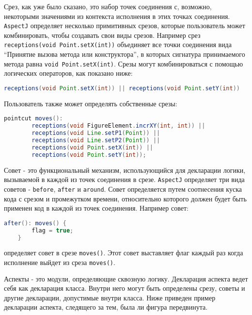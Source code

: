 Срез, как уже было сказано, это набор точек соединения с, возможно, некоторыми значениями из контекста исполнения в этих точках соединения. \texttt{AspectJ} определяет несколько примитивных срезов, которые пользователь может комбинировать, чтобы создавать свои виды срезов. Например срез \texttt{receptions(void Point.setX(int))} объединяет все точки соединения вида ``Принятие вызова метода или конструктора'', в которых сигнатура принимаемого метода равна \texttt{void Point.setX(int)}. Срезы могут комбинироваться с помощью логических операторов, как показано ниже:

\begin{lstlisting}[language=Java, caption={Срез, следящий за координатой точки \texttt{x} или \texttt{y}.}]
    receptions(void Point.setX(int)) || receptions(void Point.setY(int))
\end{lstlisting}

Пользователь также может определять собственные срезы:

\begin{lstlisting}[language=Java, caption={Пользовательский срез, следящий за координатой точки \texttt{x} или \texttt{y}.}]
    pointcut moves():
        receptions(void FigureElement.incrXY(int, int)) ||
        receptions(void Line.setP1(Point)) ||
        receptions(void Line.setP2(Point)) ||
        receptions(void Point.setX(int)) ||
        receptions(void Point.setY(int));
\end{lstlisting}

Совет - это функциональный механизм, использующийся для декларации логики, вызываемой в каждой из точек соединения в срезе. \texttt{AspectJ} определяет три вида советов - \texttt{before}, \texttt{after} и \texttt{around}. Совет определяется путем соотнесения куска кода с срезом и промежутком времени, относительно которого должен будет быть применен код в каждой из точек соединения. Например совет:

\begin{lstlisting}[language=Java, caption={Совет, отмечающий изменения точки \texttt{x} или \texttt{y}.}]
    after(): moves() {
        flag = true;
    }
\end{lstlisting}

определяет совет в срезе \texttt{moves()}. Этот совет выставляет флаг каждый раз когда исполнение выйдет из среза \texttt{moves()}.

Аспекты - это модули, определяющие сквозную логику. Декларация аспекта ведет себя как декларация класса. Внутри него могут быть определены срезу, советы и другие декларации, допустимые внутри класса. Ниже приведен пример декларации аспекта, следящего за тем, была ли фигура передвинута.

